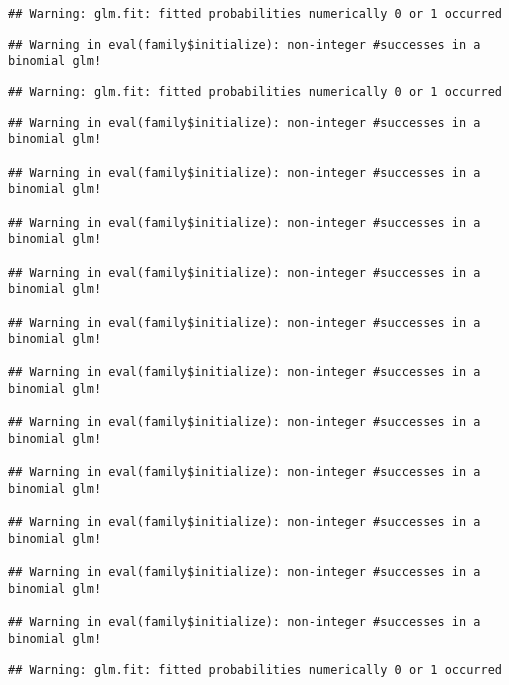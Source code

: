 \documentclass[
]{article}
\begin{document}
\begin{verbatim}
## Warning: glm.fit: fitted probabilities numerically 0 or 1 occurred
\end{verbatim}

\begin{verbatim}
## Warning in eval(family$initialize): non-integer #successes in a binomial glm!
\end{verbatim}

\begin{verbatim}
## Warning: glm.fit: fitted probabilities numerically 0 or 1 occurred
\end{verbatim}

\begin{verbatim}
## Warning in eval(family$initialize): non-integer #successes in a binomial glm!

## Warning in eval(family$initialize): non-integer #successes in a binomial glm!

## Warning in eval(family$initialize): non-integer #successes in a binomial glm!

## Warning in eval(family$initialize): non-integer #successes in a binomial glm!

## Warning in eval(family$initialize): non-integer #successes in a binomial glm!

## Warning in eval(family$initialize): non-integer #successes in a binomial glm!

## Warning in eval(family$initialize): non-integer #successes in a binomial glm!

## Warning in eval(family$initialize): non-integer #successes in a binomial glm!

## Warning in eval(family$initialize): non-integer #successes in a binomial glm!

## Warning in eval(family$initialize): non-integer #successes in a binomial glm!

## Warning in eval(family$initialize): non-integer #successes in a binomial glm!
\end{verbatim}

\begin{verbatim}
## Warning: glm.fit: fitted probabilities numerically 0 or 1 occurred
\end{verbatim}
\end{document}
